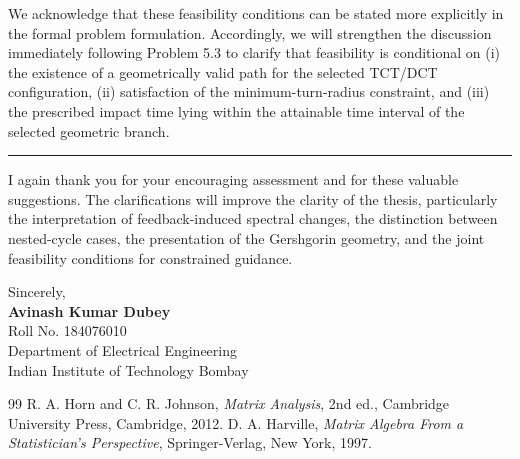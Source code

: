 \documentclass[11pt,a4paper]{article}
\newcounter{problem}
\begin{document}
We acknowledge that these feasibility conditions can be stated more explicitly in the formal problem formulation. Accordingly, we will strengthen the discussion immediately following Problem 5.3 to clarify that feasibility is conditional on (i) the existence of a geometrically valid path for the selected TCT/DCT configuration, (ii) satisfaction of the minimum-turn-radius constraint, and (iii) the prescribed impact time lying within the attainable time interval of the selected geometric branch.

\vspace{10pt}
\hrule
\vspace{8pt}
I again thank you for your encouraging assessment and for these valuable suggestions. The clarifications will improve the clarity of the thesis, particularly the interpretation of feedback-induced spectral changes, the distinction between nested-cycle cases, the presentation of the Gershgorin geometry, and the joint feasibility conditions for constrained guidance.

\vspace{14pt}
Sincerely,\\[18pt]
\textbf{Avinash Kumar Dubey}\\
Roll No. 184076010\\
Department of Electrical Engineering\\
Indian Institute of Technology Bombay

\clearpage
\begin{thebibliography}{99}
	R. A. Horn and C. R. Johnson,
	\textit{Matrix Analysis},
	2nd ed., Cambridge University Press, Cambridge, 2012.
	D. A. Harville,
	\textit{Matrix Algebra From a Statistician's Perspective},
	Springer-Verlag, New York, 1997.
\end{thebibliography}
\end{document}
